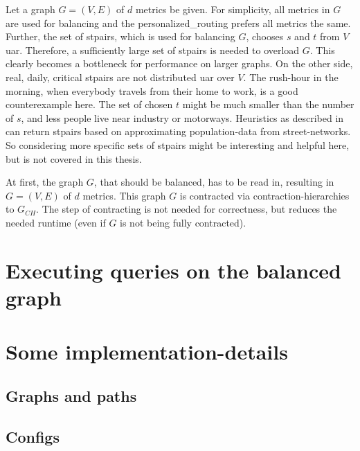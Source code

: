     Let a graph $G = (V, E)$ of $d$ \glspl{metric} be given.
    For simplicity, all \glspl{metric} in $G$ are used for balancing and the \gls{personalized_routing} prefers all \glspl{metric} the same.
    Further, the set of \glspl{stpair}, which is used for balancing $G$, chooses $s$ and $t$ from $V$ \gls{uar}.
    Therefore, a sufficiently large set of \glspl{stpair} is needed to overload $G$.
    This clearly becomes a bottleneck for performance on larger graphs.
    On the other side, real, daily, critical \glspl{stpair} are not distributed \gls{uar} over $V$.
    The rush-hour in the morning, when everybody travels from their home to work, is a good counterexample here.
    The set of chosen $t$ might be much smaller than the number of $s$, and less people live near industry or motorways.
    Heuristics as described in~\cite{bakillah:population_from_osm} can return \glspl{stpair} based on approximating population-data from street-networks.
    So considering more specific sets of \glspl{stpair} might be interesting and helpful here, but is not covered in this thesis.

    At first, the graph $G$, that should be balanced, has to be read in, resulting in $G = (V, E)$ of $d$ \glspl{metric}.
    This graph $G$ is contracted via \gls{contraction-hierarchies} to $G_{CH}$.
    The step of contracting is not needed for correctness, but reduces the needed runtime (even if $G$ is not being fully contracted).

\section{Executing queries on the balanced graph}


\section{Some implementation-details}
\label{chap:balancing:implementation}


    \subsection{Graphs and paths}



    \subsection{Configs}

